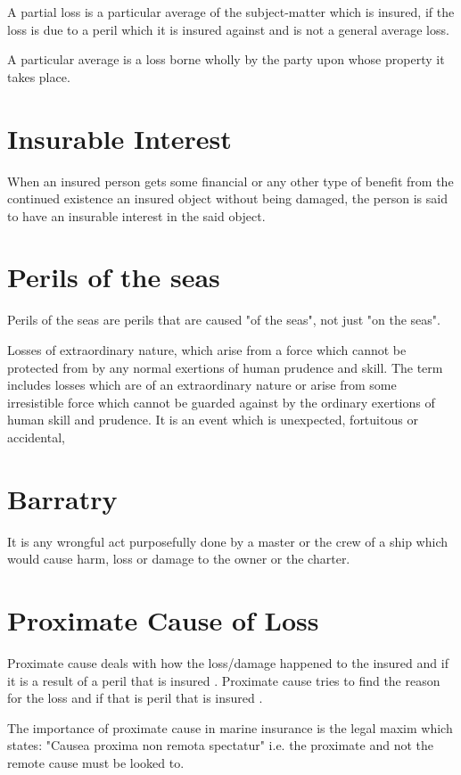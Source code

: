 A partial loss is a particular average  of the subject-matter which is insured, if the loss is due to a peril which it is insured against and is not a general average loss.
 \cite{marineInsuranceAct55}

A particular average is a loss borne wholly by the party upon whose property it takes place.

\section{Insurable Interest}

When an insured person gets some financial or any other type of benefit from  the continued existence an insured object without being damaged, the person is said to have an insurable interest in the said object.

\section{Perils of the seas}

Perils of the seas are perils that are caused "of the seas", not just "on the seas". \cite{wilsonsonsvxanoth}


Losses of extraordinary nature, which arise from a force which cannot be protected from by any normal exertions of human prudence and skill. 
The term includes losses which are of an extraordinary nature or arise  from some irresistible force which cannot be guarded against by the ordinary exertions of human skill and prudence. It is an event which is unexpected, fortuitous or accidental,

\section{Barratry}

It is any wrongful act purposefully done by a master or the crew of a ship which would cause harm, loss or damage to the owner or the charter.
\cite{marineInsuranceAct55}

\section{Proximate Cause of Loss}

Proximate cause deals with how the loss/damage happened to the insured and if it is a result of a peril that is insured . Proximate cause tries to find the reason for the loss and if that is peril that is insured .

The importance of proximate cause in  marine insurance is the legal maxim which states: "Causea proxima non remota spectatur" i.e. the proximate and not the remote cause must be looked to. \cite{marineInsuranceAct55}



